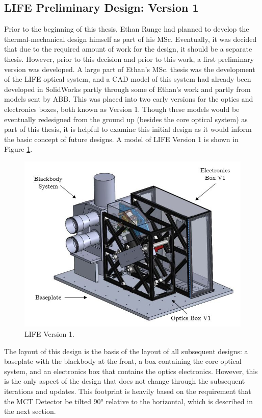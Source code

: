 \subsection{LIFE Preliminary Design: Version 1} 
Prior to the beginning of this thesis, Ethan Runge had planned to develop the thermal-mechanical design himself as part of his MSc. Eventually, it was decided that due to the required amount of work for the design, it should be a separate thesis. However, prior to this decision and prior to this work, a first preliminary version was developed. A large part of Ethan's MSc. thesis was the development of the LIFE optical system, and a CAD model of this system had already been developed in SolidWorks partly through some of Ethan's work and partly from models sent by ABB. This was placed into two early versions for the optics and electronics boxes, both known as Version 1. Though these models would be eventually redesigned from the ground up (besides the core optical system) as part of this thesis, it is helpful to examine this initial design as it would inform the basic concept of future designs. A model of LIFE Version 1 is shown in Figure \ref{fig:LIFE_V1}.

\begin{figure}[h]
    \centering
    \includegraphics[width=0.8\linewidth]{chap3_images/LIFE_V1_images/LIFE_V1_labelled.JPG}
    \caption{LIFE Version 1.}
    \label{fig:LIFE_V1}
\end{figure}

The layout of this design is the basis of the layout of all subsequent designs: a baseplate with the blackbody at the front, a box containing the core optical system, and an electronics box that contains the optics electronics. However, this is the only aspect of the design that does not change through the subsequent iterations and updates. This footprint is heavily based on the requirement that the MCT Detector be tilted 90° relative to the horizontal, which is described in the next section.

